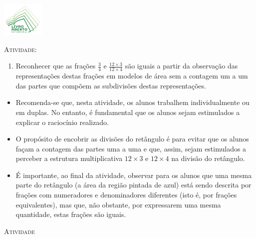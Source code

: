 \documentclass[10 pt,usenames,dvipsnames, oneside]{article}
\begin{document}
\begin{center}
  \begin{minipage}[l]{3cm}
\includegraphics[width=2cm]{../../../Figuras/logo}       
\end{minipage}\hfill
\begin{minipage}[r]{.8\textwidth}
 {\Large \scshape Atividade: }  
\end{minipage}
\end{center}
\vspace{.2cm}

\ifdefined\prof
\begin{goals}
\begin{enumerate}
\item       Reconhecer que as frações       $\frac{3}{4}$       e
$\frac{12 \times 3}{12 \times 4}$       são iguais a partir da observação das
representações destas frações em modelos de área sem a contagem um a um das
partes que compõem as subdivisões destas representações.
\end{enumerate}

\tcblower

\begin{itemize}
\item       Recomenda-se que, nesta atividade, os alunos trabalhem
individualmente ou em duplas. No entanto, é fundamental que os alunos sejam
estimulados a explicar o raciocínio realizado.
\item       O propósito de encobrir as divisões do retângulo é para evitar
que os alunos façam a contagem das partes uma a uma e que, assim, sejam
estimulados a perceber a estrutura multiplicativa       $12 \times 3$       e
$12 \times 4$       na divisão do retângulo.
\item       É importante, ao final da atividade, observar para os alunos que
uma mesma parte do retângulo (a área da região pintada de azul) está sendo
descrita por frações com numeradores e denominadores diferentes (isto é, por
frações equivalentes), mas que, não obstante, por expressarem uma mesma
quantidade, estas frações são iguais. 
\end{itemize}
\end{goals}

\bigskip
\begin{center}
{\large \scshape Atividade}
\end{center}
\fi
\end{document}

